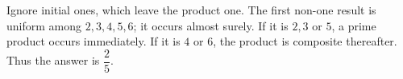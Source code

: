 Ignore initial ones, which leave the product one. The first non-one result is uniform among $2,3,4,5,6$; it occurs almost surely. If it is $2,3$ or $5$, a prime product occurs immediately. If it is $4$ or $6$, the product is composite thereafter. Thus the answer is $\boxed{\dfrac{2}{5}}$.
